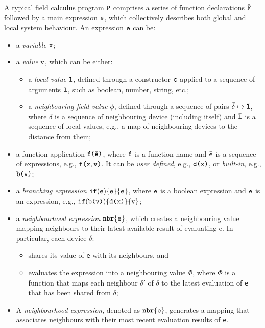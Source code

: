A typical field calculus program $\texttt{P}$ comprises a series of function declarations $\bar{\texttt{F}}$ followed by a main expression $\texttt{e}$, 
 which collectively describes both global and local system behaviour. 
An expression $\texttt{e}$ can be:
\begin{itemize}
    \item a \emph{variable} $\texttt{x}$;
    \item a \emph{value} $\texttt{v}$, which can be either:
    \begin{itemize}
        \item a \emph{local value} $\texttt{l}$, defined through a constructor $\texttt{c}$ applied to a sequence of arguments $\bar{\texttt{l}}$, such as boolean, number, string, etc.;
        \item a \emph{neighbouring field value} $\phi$, defined through a sequence of pairs $\bar{\delta} \mapsto \bar{\texttt{l}}$, where $\bar{\delta}$ is a sequence of neighbouring device (including itself) and $\bar{\texttt{l}}$ is a sequence of local values, e.g., a map of neighbouring devices to the distance from them;
    \end{itemize}
    \item a function application $\texttt{f(}\bar{\texttt{e}}\texttt{)}$, where $\texttt{f}$ is a function name and $\bar{\texttt{e}}$ is a sequence of expressions, e.g., $\texttt{f(}\texttt{x}, \texttt{v}\texttt{)}$. 
    It can be \emph{user defined}, e.g., $\texttt{d(}\texttt{x}\texttt{)}$, or \emph{built-in}, e.g., $\texttt{b(}\texttt{v}\texttt{)}$;
    \item a \emph{branching expression} $\texttt{if}(\texttt{e})\{\texttt{e}\}\{\texttt{e}\}$, where $\texttt{e}$ is a boolean expression and $\texttt{e}$ is an expression, e.g., $\texttt{if}(\texttt{b(}\texttt{v}\texttt{)})\{\texttt{d(}\texttt{x}\texttt{)}\}\{\texttt{v}\}$; 
    \item a \emph{neighbourhood expression} $\texttt{nbr}\{\texttt{e}\}$, 
    which creates a neighbouring value mapping neighbours to their latest available result of evaluating e. In particular, each
    device $\delta$:
    \begin{itemize}
        \item shares its value of \texttt{e} with its neighbours, and
        \item evaluates the expression into a neighbouring value $\Phi$, where $\Phi$ is a function that maps each neighbour $\delta'$ of $\delta$ to the latest evaluation of \texttt{e} that
        has been shared from $\delta$;
    \end{itemize}
    \item A \emph{neighbourhood expression}, denoted as $\texttt{nbr}\{\texttt{e}\}$, 
     generates a mapping that associates neighbours with their most recent evaluation results of \texttt{e}. 

\end{itemize}
